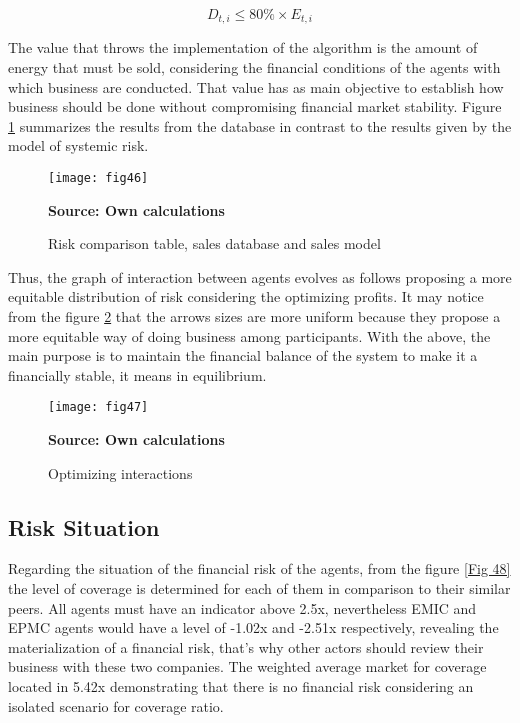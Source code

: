 \documentclass[12pt]{book}
\begin{document}
\begin{equation}
D_{t,i} \leq 80\% \times E_{t,i}
\end{equation}

The value that throws the implementation of the algorithm is the amount of energy that must be sold, considering the financial conditions of the agents with which business are conducted. That value has as main objective to establish how business should be done without compromising financial market stability. Figure \ref{Fig 46} summarizes the results from the database in contrast to the results given by the model of systemic risk.

\begin{figure}  
\centering    
\texttt{[image: fig46]}  
\caption{Risk comparison table, sales database and sales model}
\scriptsize 
\textbf{Source: Own calculations}
\captionsetup{justification=centering,margin=1cm}   
\label{Fig 46}
\end{figure}

Thus, the graph of interaction between agents evolves as follows proposing a more equitable distribution of risk considering the optimizing profits. It may notice from the figure \ref{Fig 47} that the arrows sizes are more uniform because they propose a more equitable way of doing business among participants. With the above, the main purpose is to maintain the financial balance of the system to make it a financially stable, it means in equilibrium.

\begin{figure}  
\centering    
\texttt{[image: fig47]}  
\caption{Optimizing interactions}
\scriptsize 
\textbf{Source: Own calculations}
\captionsetup{justification=centering,margin=1cm}   
\label{Fig 47}
\end{figure}

\subsection{Risk Situation}

Regarding the situation of the financial risk of the agents, from the figure \ref{Fig 48} the level of coverage is determined for each of them in comparison to their similar peers. All agents must have an indicator above 2.5x, nevertheless EMIC and EPMC agents would have a level of -1.02x and -2.51x respectively, revealing the materialization of a financial risk, that's why other actors should review their business with these two companies. The weighted average market for coverage located in 5.42x demonstrating that there is no financial risk considering an isolated scenario for coverage ratio.
\end{document}
